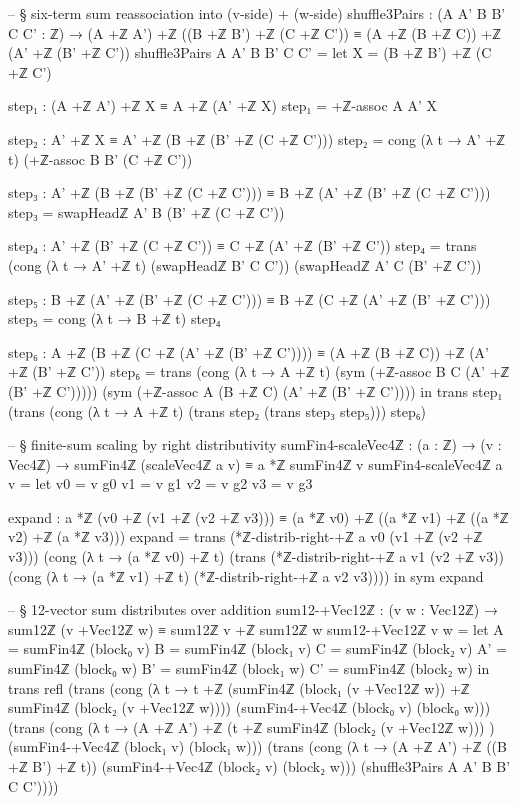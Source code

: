 \documentclass[11pt,a4paper]{book}
\begin{document}
\begin{code}
-- § six-term sum reassociation into (v-side) + (w-side)
shuffle3Pairs : (A A' B B' C C' : ℤ) →
  (A +ℤ A') +ℤ ((B +ℤ B') +ℤ (C +ℤ C')) ≡ (A +ℤ (B +ℤ C)) +ℤ (A' +ℤ (B' +ℤ C'))
shuffle3Pairs A A' B B' C C' =
  let
    X = (B +ℤ B') +ℤ (C +ℤ C')

    step₁ : (A +ℤ A') +ℤ X ≡ A +ℤ (A' +ℤ X)
    step₁ = +ℤ-assoc A A' X

    step₂ : A' +ℤ X ≡ A' +ℤ (B +ℤ (B' +ℤ (C +ℤ C')))
    step₂ = cong (λ t → A' +ℤ t) (+ℤ-assoc B B' (C +ℤ C'))

    step₃ : A' +ℤ (B +ℤ (B' +ℤ (C +ℤ C'))) ≡ B +ℤ (A' +ℤ (B' +ℤ (C +ℤ C')))
    step₃ = swapHeadℤ A' B (B' +ℤ (C +ℤ C'))

    step₄ : A' +ℤ (B' +ℤ (C +ℤ C')) ≡ C +ℤ (A' +ℤ (B' +ℤ C'))
    step₄ =
      trans
        (cong (λ t → A' +ℤ t) (swapHeadℤ B' C C'))
        (swapHeadℤ A' C (B' +ℤ C'))

    step₅ : B +ℤ (A' +ℤ (B' +ℤ (C +ℤ C'))) ≡ B +ℤ (C +ℤ (A' +ℤ (B' +ℤ C')))
    step₅ = cong (λ t → B +ℤ t) step₄

    step₆ : A +ℤ (B +ℤ (C +ℤ (A' +ℤ (B' +ℤ C')))) ≡ (A +ℤ (B +ℤ C)) +ℤ (A' +ℤ (B' +ℤ C'))
    step₆ =
      trans
        (cong (λ t → A +ℤ t) (sym (+ℤ-assoc B C (A' +ℤ (B' +ℤ C')))))
        (sym (+ℤ-assoc A (B +ℤ C) (A' +ℤ (B' +ℤ C'))))
  in
  trans
    step₁
    (trans
      (cong (λ t → A +ℤ t) (trans step₂ (trans step₃ step₅)))
      step₆)

-- § finite-sum scaling by right distributivity
sumFin4-scaleVec4ℤ : (a : ℤ) → (v : Vec4ℤ) →
  sumFin4ℤ (scaleVec4ℤ a v) ≡ a *ℤ sumFin4ℤ v
sumFin4-scaleVec4ℤ a v =
  let
    v0 = v g0
    v1 = v g1
    v2 = v g2
    v3 = v g3

    expand : a *ℤ (v0 +ℤ (v1 +ℤ (v2 +ℤ v3))) ≡ (a *ℤ v0) +ℤ ((a *ℤ v1) +ℤ ((a *ℤ v2) +ℤ (a *ℤ v3)))
    expand =
      trans
        (*ℤ-distrib-right-+ℤ a v0 (v1 +ℤ (v2 +ℤ v3)))
        (cong (λ t → (a *ℤ v0) +ℤ t)
          (trans
            (*ℤ-distrib-right-+ℤ a v1 (v2 +ℤ v3))
            (cong (λ t → (a *ℤ v1) +ℤ t)
              (*ℤ-distrib-right-+ℤ a v2 v3))))
  in
  sym expand

-- § 12-vector sum distributes over addition
sum12-+Vec12ℤ : (v w : Vec12ℤ) → sum12ℤ (v +Vec12ℤ w) ≡ sum12ℤ v +ℤ sum12ℤ w
sum12-+Vec12ℤ v w =
  let
    A  = sumFin4ℤ (block₀ v)
    B  = sumFin4ℤ (block₁ v)
    C  = sumFin4ℤ (block₂ v)
    A' = sumFin4ℤ (block₀ w)
    B' = sumFin4ℤ (block₁ w)
    C' = sumFin4ℤ (block₂ w)
  in
  trans
    refl
    (trans
      (cong
        (λ t → t +ℤ (sumFin4ℤ (block₁ (v +Vec12ℤ w)) +ℤ sumFin4ℤ (block₂ (v +Vec12ℤ w))))
        (sumFin4-+Vec4ℤ (block₀ v) (block₀ w)))
      (trans
        (cong
          (λ t → (A +ℤ A') +ℤ (t +ℤ sumFin4ℤ (block₂ (v +Vec12ℤ w))) )
          (sumFin4-+Vec4ℤ (block₁ v) (block₁ w)))
        (trans
          (cong
            (λ t → (A +ℤ A') +ℤ ((B +ℤ B') +ℤ t))
            (sumFin4-+Vec4ℤ (block₂ v) (block₂ w)))
          (shuffle3Pairs A A' B B' C C'))))


\end{code}
\end{document}
